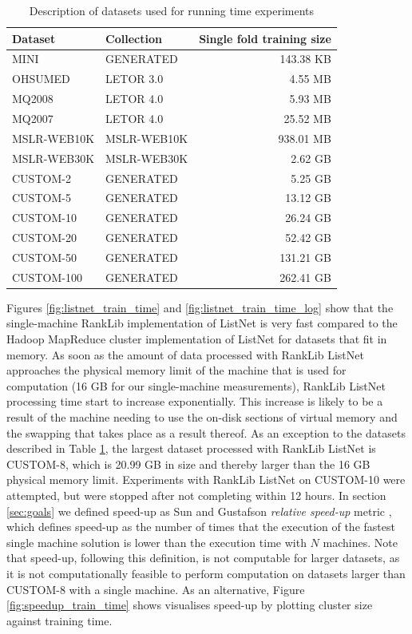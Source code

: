 \begin{table}
\centering
\begin{tabular}{p{3.4cm}p{3.4cm}r}\toprule
Dataset & Collection & Single fold training size \\
\midrule
MINI		& GENERATED		  & 143.38 KB\\
OHSUMED     & LETOR 3.0       &   4.55 MB\\
MQ2008      & LETOR 4.0       &   5.93 MB\\
MQ2007      & LETOR 4.0       &  25.52 MB\\
MSLR-WEB10K & MSLR-WEB10K     & 938.01 MB\\
MSLR-WEB30K & MSLR-WEB30K     &   2.62 GB\\
CUSTOM-2	& GENERATED		  &   5.25 GB\\
CUSTOM-5	& GENERATED		  &  13.12 GB\\
CUSTOM-10	& GENERATED		  &  26.24 GB\\
CUSTOM-20   & GENERATED       &  52.42 GB\\
CUSTOM-50	& GENERATED		  & 131.21 GB\\
CUSTOM-100	& GENERATED		  & 262.41 GB\\
\bottomrule
\end{tabular}
\caption{Description of datasets used for running time experiments}
\label{tbl:recap_datasets}
\end{table}

Figures \ref{fig:listnet_train_time} and \ref{fig:listnet_train_time_log} show that the single-machine RankLib implementation of ListNet is very fast compared to the Hadoop MapReduce cluster implementation of ListNet for datasets that fit in memory. As soon as the amount of data processed with RankLib ListNet approaches the physical memory limit of the machine that is used for computation (16 GB for our single-machine measurements), RankLib ListNet processing time start to increase exponentially. This increase is likely to be a result of the machine needing to use the on-disk sections of virtual memory and the swapping that takes place as a result thereof. As an exception to the datasets described in Table \ref{tbl:recap_datasets}, the largest dataset processed with RankLib ListNet is CUSTOM-8, which is 20.99 GB in size and thereby larger than the 16 GB physical memory limit. Experiments with RankLib ListNet on CUSTOM-10 were attempted, but were stopped after not completing within 12 hours. In section \ref{sec:goals} we defined speed-up as Sun and Gustafson \emph{relative speed-up} metric \cite{Sun1991}, which defines speed-up as the number of times that the execution of the fastest single machine solution is lower than the execution time with $N$ machines. Note that speed-up, following this definition, is not computable for larger datasets, as it is not computationally feasible to perform computation on datasets larger than CUSTOM-8 with a single machine. As an alternative, Figure \ref{fig:speedup_train_time} shows visualises speed-up by plotting cluster size against training time.\\


